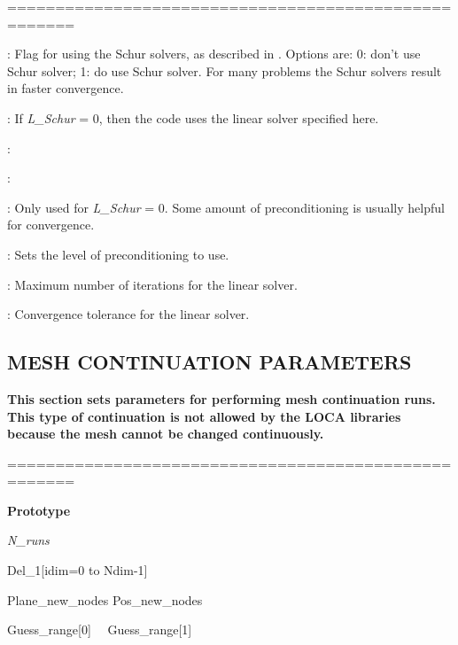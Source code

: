 \documentclass[10pt,onecolumn]{article}
\begin{document}
\noindent=====================================================
\vspace{0.1in}


\vspace{0.1in}
: Flag for using the Schur solvers, as described in \cite{heroux}.  Options are: 0: don't use Schur solver; 1: do use Schur solver.  For many problems the Schur solvers result in faster convergence.

\vspace{0.1in}
: If {\it L\_Schur} = 0, then the code uses the linear solver specified here.  

\vspace{0.1in}
:

\vspace{0.1in}
:

\vspace{0.1in}
: Only used for  {\it L\_Schur} = 0.  Some amount of preconditioning is usually helpful for convergence.

\vspace{0.1in}
: Sets the level of preconditioning to use.

\vspace{0.1in}
: Maximum number of iterations for the linear solver.

\vspace{0.1in}
:  Convergence tolerance for the linear solver.


\vfill
\break

\subsection{MESH CONTINUATION PARAMETERS}
{\bf  This section sets
parameters for performing mesh continuation runs.  This type
of continuation is not allowed by the LOCA libraries because the
mesh cannot be changed continuously.}

\noindent=====================================================

{\bf Prototype}

{\it N\_runs

Del\_1[idim=0 to Ndim-1]

Plane\_new\_nodes  Pos\_new\_nodes

Guess\_range[0] \ \ Guess\_range[1] 
}
\end{document}
